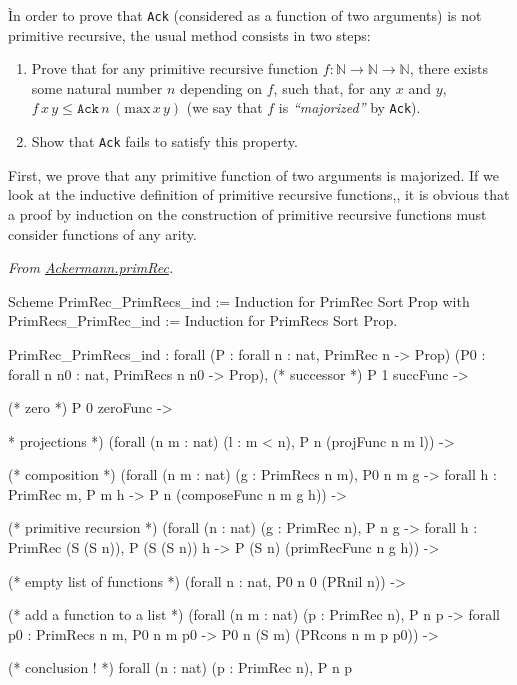 Ìn order to prove that \texttt{Ack} (considered as a function of two arguments) is not primitive recursive, the usual method consists in two steps:


\begin{enumerate}
\item Prove that for any primitive recursive function $f:\mathbb{N}\rightarrow\mathbb{N}\rightarrow\mathbb{N}$, there exists some natural number $n$ depending on $f$, such that, for any $x$ and $y$, 
$f\,x\,y \leq \texttt{Ack}\,n\,(\textrm{max}\,x\,y)$ (we say that $f$ is \emph{``majorized''}  by \texttt{Ack}).
\item Show that \texttt{Ack} fails to satisfy this property.
\end{enumerate}

First, we prove that any primitive function of two arguments is majorized.
If we look at the inductive definition of primitive recursive functions,\pageref{def:Primrec}, it is obvious that a proof by induction on the construction of primitive recursive functions must consider functions of any arity.

\vspace{4pt}
\noindent
\emph{From \href{../theories/html/hydras.Ackermann.primRec.html}{Ackermann.primRec}.}

\begin{Coqsrc}
Scheme PrimRec_PrimRecs_ind := Induction for PrimRec
  Sort Prop
  with PrimRecs_PrimRec_ind := Induction for PrimRecs 
  Sort Prop.
\end{Coqsrc}

\begin{Coqanswer}
PrimRec_PrimRecs_ind :
forall (P : forall n : nat, PrimRec n -> Prop)
  (P0 : forall n n0 : nat, PrimRecs n n0 -> Prop),
(* successor *)
P 1 succFunc ->

(* zero *)
P 0 zeroFunc ->

* projections *)
(forall (n m : nat) (l : m < n), P n (projFunc n m l)) ->

(* composition *) 
(forall (n m : nat) (g : PrimRecs n m),
      P0 n m g -> forall h : PrimRec m, P m h -> 
      P n (composeFunc n m g h)) ->

(* primitive recursion *)
(forall (n : nat) (g : PrimRec n),
 P n g ->
    forall h : PrimRec (S (S n)), P (S (S n)) h -> 
     P (S n) (primRecFunc n g h)) ->

(* empty list of functions *)
(forall n : nat, P0 n 0 (PRnil n)) ->

(* add a function to a list *)
(forall (n m : nat) (p : PrimRec n),
   P n p -> 
   forall p0 : PrimRecs n m, P0 n m p0 -> 
   P0 n (S m) (PRcons n m p p0)) ->

(* conclusion ! *)
forall (n : nat) (p : PrimRec n), P n p
\end{Coqanswer}

